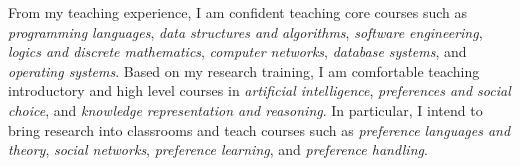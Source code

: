 \documentclass[12pt]{article}
\newcommand{\tit}[1]{\textit{#1}}
\begin{document}
From my teaching experience, I am confident teaching core courses such as
\tit{programming languages}, \tit{data structures and algorithms}, \tit{software engineering},
\tit{logics and discrete mathematics},
\tit{computer networks}, \tit{database systems}, and \tit{operating systems}.
Based on my research training, I am comfortable teaching introductory and high 
level courses in \tit{artificial intelligence},
\tit{preferences and social choice}, and \tit{knowledge representation and reasoning}.
In particular, I intend to bring research into classrooms and teach courses such as
\tit{preference languages and theory}, \tit{social networks},
\tit{preference learning}, and \tit{preference handling}.
\end{document}
